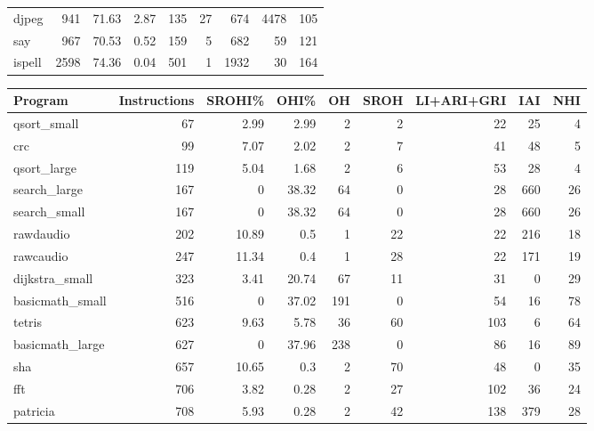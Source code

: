 \begin{tabular}{lrrrrrrrr}
 djpeg           &      941 &    71.63 &   2.87 &  135 &   27 &    674 &  4478 &   105 \\
 say             &      967 &    70.53 &   0.52 &  159 &    5 &    682 &    59 &   121 \\
 ispell          &     2598 &    74.36 &   0.04 &  501 &    1 &   1932 &    30 &   164 \\
\hline
\end{tabular}\begin{tabular}{lrrrrrrrr}
\hline
 Program         &   Instructions &   SROHI\% &   OHI\% &   OH &   SROH &   LI+ARI+GRI &   IAI &   NHI \\
\hline
 qsort\_small     &             67 &     2.99 &   2.99 &    2 &      2 &           22 &    25 &     4 \\
 crc             &             99 &     7.07 &   2.02 &    2 &      7 &           41 &    48 &     5 \\
 qsort\_large     &            119 &     5.04 &   1.68 &    2 &      6 &           53 &    28 &     4 \\
 search\_large    &            167 &     0    &  38.32 &   64 &      0 &           28 &   660 &    26 \\
 search\_small    &            167 &     0    &  38.32 &   64 &      0 &           28 &   660 &    26 \\
 rawdaudio       &            202 &    10.89 &   0.5  &    1 &     22 &           22 &   216 &    18 \\
 rawcaudio       &            247 &    11.34 &   0.4  &    1 &     28 &           22 &   171 &    19 \\
 dijkstra\_small  &            323 &     3.41 &  20.74 &   67 &     11 &           31 &     0 &    29 \\
 basicmath\_small &            516 &     0    &  37.02 &  191 &      0 &           54 &    16 &    78 \\
 tetris          &            623 &     9.63 &   5.78 &   36 &     60 &          103 &     6 &    64 \\
 basicmath\_large &            627 &     0    &  37.96 &  238 &      0 &           86 &    16 &    89 \\
 sha             &            657 &    10.65 &   0.3  &    2 &     70 &           48 &     0 &    35 \\
 fft             &            706 &     3.82 &   0.28 &    2 &     27 &          102 &    36 &    24 \\
 patricia        &            708 &     5.93 &   0.28 &    2 &     42 &          138 &   379 &    28 \\

\end{tabular}
